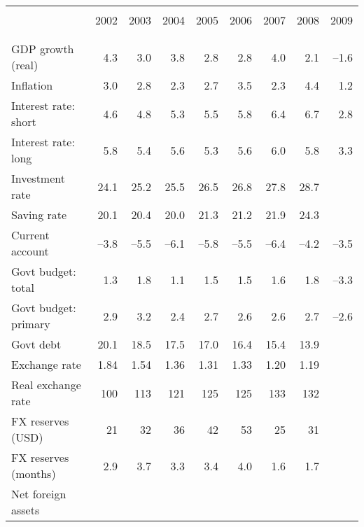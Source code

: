 \documentclass[letterpaper,12pt]{exam}
\begin{document}
%
\begin{table}[h]
\vspace{1em}%
\centering%
\hspace{-6cm}%
\begin{minipage}
{0.52\textwidth}%
\begin{center}{\small
\begin{tabular}{lrrrrrrrr}%
\vspace{-0.6cm}\\
\hline%
\vspace{-.3cm}\\
    & 2002 & 2003 & 2004 & 2005 & 2006 &  2007 &  2008 & 2009 \\%
\vspace{-.3cm}\\
\hline%
\vspace{-.2cm}\\
GDP growth (real) & 4.3 & 3.0 & 3.8 & 2.8 & 2.8 & 4.0 & 2.1 
        & --1.6 \\
Inflation 
        & 3.0 & 2.8 & 2.3 & 2.7 & 3.5 & 2.3 & 4.4 & 1.2 \\
Interest rate:  short
        & 4.6 & 4.8 & 5.3 & 5.5 & 5.8 & 6.4 & 6.7 & 2.8 \\
Interest rate:  long 
        & 5.8 & 5.4 & 5.6 & 5.3 & 5.6 & 6.0 & 5.8 & 3.3 \\            
Investment rate    
        & 24.1 & 25.2 & 25.5 & 26.5 & 26.8 & 27.8 & 28.7 &  \\
Saving rate          
        & 20.1 & 20.4 & 20.0 & 21.3 & 21.2 & 21.9 & 24.3 &  \\
Current account 
        & --3.8 & --5.5 & --6.1 & --5.8 & --5.5 
        & --6.4 & --4.2 & --3.5 \\
Govt budget:  total
        & 1.3 & 1.8 & 1.1 & 1.5 & 1.5 & 1.6 & 1.8 & --3.3 \\
Govt budget:  primary 
        & 2.9 & 3.2 & 2.4 & 2.7 & 2.6 & 2.6 & 2.7 & --2.6 \\
Govt debt
        & 20.1 & 18.5 & 17.5 & 17.0 & 16.4 & 15.4 & 13.9  \\
Exchange rate 
        & 1.84 & 1.54 & 1.36 & 1.31 & 1.33 & 1.20 & 1.19 \\        
Real exchange rate 
        & 100 &  113 & 121 & 125 & 125 & 133 & 132 \\
FX reserves (USD) 
        & 21 & 32 & 36 & 42 & 53 & 25 & 31 & \\
FX reserves (months) 
        &  2.9 & 3.7 & 3.3 & 3.4 & 4.0 & 1.6 & 1.7 \\        
Net foreign assets  

\end{tabular}}
\end{center}
\end{minipage}
\end{table}
\end{document}
